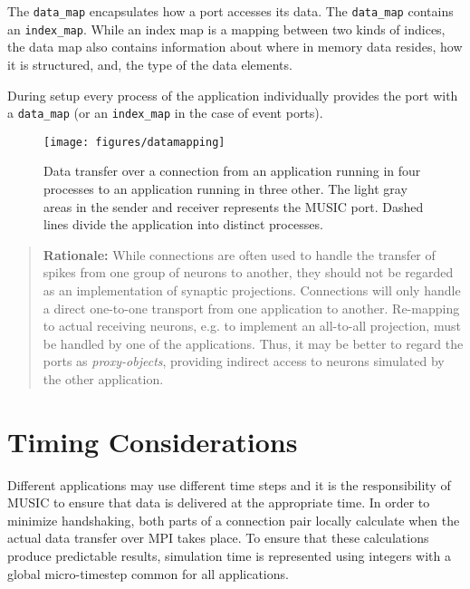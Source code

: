 \documentclass[a4paper]{report}
\newenvironment{rationale}%
{\par\begin{quote}\textbf{Rationale:}}%
{\par\end{quote}}
\begin{document}
The \lstinline|data_map| encapsulates how a port accesses its data.
The \lstinline|data_map| contains an \lstinline|index_map|.  While an
index map is a mapping between two kinds of indices, the data map also
contains information about where in memory data resides, how it is
structured, and, the type of the data elements.

During setup every process of the application individually provides
the port with a \lstinline|data_map| (or an \lstinline|index_map| in
the case of event ports).

\begin{figure}
  \begin{center}
    \texttt{[image: figures/datamapping]}
    \caption[Mapping of data]{\label{fig:datamapping}
      Data transfer over a connection from an application running in
      four processes to an application running in three other.  The
      light gray areas in the sender and receiver represents the MUSIC
      port.  Dashed lines divide the application into distinct
      processes.
    }
  \end{center}
\end{figure}

\begin{rationale}
  While connections are often used to handle the transfer of spikes
  from one group of neurons to another, they should not be regarded as
  an implementation of synaptic projections.
  Connections will only handle a direct one-to-one transport from one
  application to another.  Re-mapping to actual receiving neurons,
  e.g. to implement an all-to-all projection, must be handled by one
  of the applications.  Thus, it may be better to regard the ports as
  \emph{proxy-objects}, providing indirect access
  to neurons simulated by the other application.
\end{rationale}


\section{Timing Considerations}
\label{sec:timing}
  
Different applications may use different time steps and it is the
responsibility of MUSIC to ensure that data is delivered at the
appropriate time.  In order to minimize handshaking, both parts of a
connection pair locally calculate when the actual data transfer over
MPI takes place.  To ensure that these calculations produce
predictable results, simulation time is represented using integers
with a global micro-timestep common for all
applications.
\end{document}
